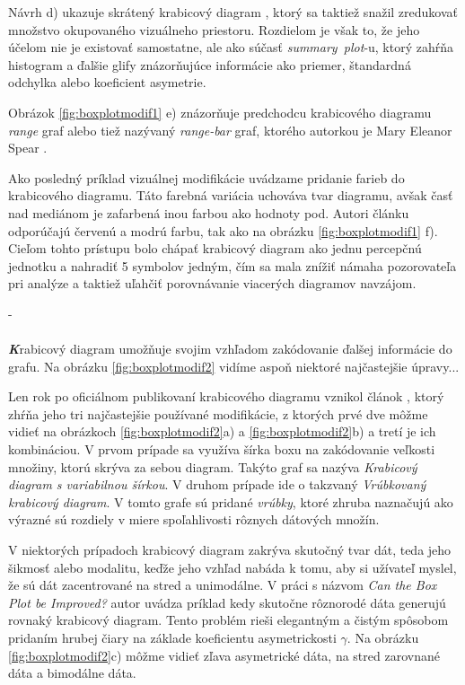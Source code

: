 Návrh d) ukazuje skrátený krabicový diagram \cite{VisualSummaryPotter}, ktorý sa taktiež snažil zredukovať množstvo okupovaného vizuálneho priestoru. Rozdielom je však to, že jeho účelom nie je existovať samostatne, ale ako súčasť \mbox{\textit{summary plot}-u}, ktorý zahŕňa histogram a ďalšie glify znázorňujúce informácie ako priemer, štandardná odchylka alebo koeficient asymetrie.

Obrázok \ref{fig:boxplotmodif1} e) znázorňuje predchodcu krabicového diagramu \textit{range} graf alebo tiež nazývaný \mbox{\textit{range-bar}} graf, ktorého autorkou je Mary Eleanor Spear \cite{Spear}.

Ako posledný príklad vizuálnej modifikácie uvádzame pridanie farieb do krabicového diagramu. Táto farebná variácia uchováva tvar diagramu, avšak časť nad mediánom je zafarbená inou farbou ako hodnoty pod. Autori článku odporúčajú červenú a modrú farbu, tak ako na obrázku \ref{fig:boxplotmodif1} f). Cieľom tohto prístupu bolo chápať krabicový diagram ako jednu percepčnú jednotku a nahradiť 5 symbolov jedným, čím sa mala znížiť námaha pozorovateľa pri analýze a taktiež uľahčiť porovnávanie viacerých diagramov navzájom. 


-


\paragraph{}
{\large \textbf{\textit{K}}}rabicový diagram umožňuje svojim vzhľadom zakódovanie ďalšej informácie do grafu. Na obrázku \ref{fig:boxplotmodif2} vidíme aspoň niektoré najčastejšie úpravy... %

Len rok po oficiálnom publikovaní krabicového diagramu vznikol článok \cite{McGill}, ktorý zhŕňa jeho tri najčastejšie používané modifikácie, z ktorých prvé dve môžme vidieť na obrázkoch \ref{fig:boxplotmodif2}a) a \ref{fig:boxplotmodif2}b) a tretí je ich kombináciou. V prvom prípade sa využíva šírka boxu na zakódovanie veľkosti množiny, ktorú skrýva za sebou diagram. Takýto graf sa nazýva \textit{Krabicový diagram s variabilnou šírkou}.  
V druhom prípade ide o takzvaný \textit{Vrúbkovaný krabicový diagram}. V tomto grafe sú pridané \textit{vrúbky}, ktoré zhruba naznačujú ako výrazné sú rozdiely v miere spoľahlivosti rôznych dátových množín. 

V niektorých prípadoch krabicový diagram zakrýva skutočný tvar dát, teda jeho šikmosť alebo modalitu, keďže jeho vzhľad nabáda k tomu, aby si užívateľ myslel, že sú dát zacentrované na stred a unimodálne. V práci s názvom \textit{Can the Box Plot be Improved?} \cite{Chamnein} autor uvádza príklad kedy skutočne rôznorodé dáta generujú rovnaký krabicový diagram. Tento problém rieši elegantným a čistým spôsobom pridaním hrubej čiary na základe koeficientu asymetrickosti $ \gamma $. Na obrázku \ref{fig:boxplotmodif2}c) môžme vidieť zľava asymetrické dáta, na stred zarovnané dáta a bimodálne dáta.


